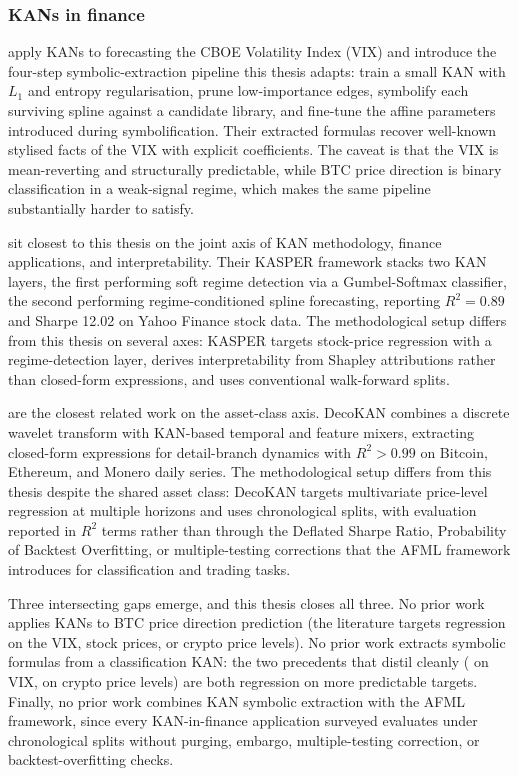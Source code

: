\subsubsection{KANs in finance}\label{subsubsec:kan_finance}

\citet{cho_lee_kim_2025} apply KANs to forecasting the CBOE Volatility Index (VIX) and introduce the four-step symbolic-extraction pipeline this thesis adapts: train a small KAN with $L_1$ and entropy regularisation, prune low-importance edges, symbolify each surviving spline against a candidate library, and fine-tune the affine parameters introduced during symbolification. Their extracted formulas recover well-known stylised facts of the VIX with explicit coefficients. The caveat is that the VIX is mean-reverting and structurally predictable, while BTC price direction is binary classification in a weak-signal regime, which makes the same pipeline substantially harder to satisfy.

\citet{oad_kasper_2025} sit closest to this thesis on the joint axis of KAN methodology, finance applications, and interpretability. Their KASPER framework stacks two KAN layers, the first performing soft regime detection via a Gumbel-Softmax classifier, the second performing regime-conditioned spline forecasting, reporting $R^2 = 0.89$ and Sharpe 12.02 on Yahoo Finance stock data. The methodological setup differs from this thesis on several axes: KASPER targets stock-price regression with a regime-detection layer, derives interpretability from Shapley attributions rather than closed-form expressions, and uses conventional walk-forward splits.

\citet{gao_decokan_2025} are the closest related work on the asset-class axis. DecoKAN combines a discrete wavelet transform with KAN-based temporal and feature mixers, extracting closed-form expressions for detail-branch dynamics with $R^2 > 0.99$ on Bitcoin, Ethereum, and Monero daily series. The methodological setup differs from this thesis despite the shared asset class: DecoKAN targets multivariate price-level regression at multiple horizons and uses chronological splits, with evaluation reported in $R^2$ terms rather than through the Deflated Sharpe Ratio, Probability of Backtest Overfitting, or multiple-testing corrections that the AFML framework introduces for classification and trading tasks.

Three intersecting gaps emerge, and this thesis closes all three. No prior work applies KANs to BTC price direction prediction (the literature targets regression on the VIX, stock prices, or crypto price levels). No prior work extracts symbolic formulas from a classification KAN: the two precedents that distil cleanly (\citet{cho_lee_kim_2025} on VIX, \citet{gao_decokan_2025} on crypto price levels) are both regression on more predictable targets. Finally, no prior work combines KAN symbolic extraction with the AFML framework, since every KAN-in-finance application surveyed evaluates under chronological splits without purging, embargo, multiple-testing correction, or backtest-overfitting checks.


